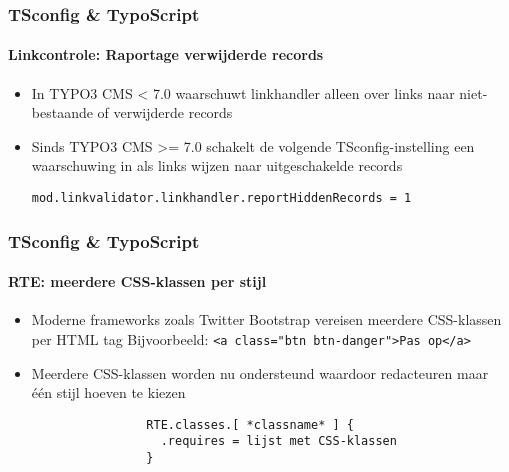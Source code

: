 
\begin{frame}[fragile]
	\frametitle{TSconfig \& TypoScript}
	\framesubtitle{Linkcontrole: Raportage verwijderde records}

	\begin{itemize}
		\item In TYPO3 CMS < 7.0 waarschuwt linkhandler alleen over links naar niet-bestaande of verwijderde records
		\item Sinds TYPO3 CMS >=  7.0 schakelt de volgende TSconfig-instelling een waarschuwing in als links wijzen naar uitgeschakelde records

			\lstinline!mod.linkvalidator.linkhandler.reportHiddenRecords = 1!

	\end{itemize}

\end{frame}


\begin{frame}[fragile]
	\frametitle{TSconfig \& TypoScript}
	\framesubtitle{RTE: meerdere CSS-klassen per stijl}

	\begin{itemize}
		\item Moderne frameworks zoals Twitter Bootstrap vereisen meerdere CSS-klassen per HTML tag\newline
			\small Bijvoorbeeld: \texttt{<a class="btn btn-danger">Pas op</a>}\normalsize
		\item Meerdere CSS-klassen worden nu ondersteund waardoor redacteuren maar één stijl hoeven te kiezen

			\begin{lstlisting}
				RTE.classes.[ *classname* ] {
				  .requires = lijst met CSS-klassen
				}
			\end{lstlisting}

	\end{itemize}

\end{frame}

